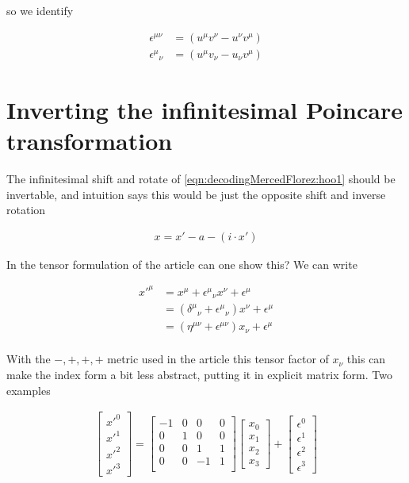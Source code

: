 so we identify

\begin{align*}
\epsilon^{\mu\nu} &= (u^\mu v^\nu - u^\nu v^\mu) \\
{\epsilon^{\mu}}_\nu &= (u^\mu v_\nu - u_\nu v^\mu)
\end{align*}

\section{Inverting the infinitesimal Poincare transformation}

The infinitesimal shift and rotate of \ref{eqn:decodingMercedFlorez:hoo1} should be invertable, and intuition says this would be just the opposite shift and inverse rotation

\begin{align}\label{eqn:decodingMercedFlorez:hoo2}
x = x' - a - (i \cdot x')
\end{align}

In the tensor formulation of the article can one show this?  We can write

\begin{align*}
{x'}^\mu 
&= x^\mu + {\epsilon^\mu}_\nu x^\nu + \epsilon^\mu \\
&= ({\delta^\mu}_\nu + {\epsilon^\mu}_\nu) x^\nu + \epsilon^\mu \\
&= (\eta^{\mu\nu} + \epsilon^{\mu\nu}) x_\nu + \epsilon^\mu \\
\end{align*}

With the $-,+,+,+$ metric used in the article this tensor factor of $x_\nu$ this can make the index form a bit less abstract, putting it in explicit matrix form.  Two examples

\begin{align*}
\begin{bmatrix}
{x'}^0 \\
{x'}^1 \\
{x'}^2 \\
{x'}^3
\end{bmatrix}
=
\begin{bmatrix}
-1 & 0 & 0 & 0 \\ 
0 & 1 & 0 & 0 \\ 
0 & 0 & 1 & 1 \\ 
0 & 0 & -1 & 1 \\ 
\end{bmatrix}
\begin{bmatrix}
x_0 \\
x_1 \\
x_2 \\
x_3
\end{bmatrix}
+
\begin{bmatrix}
\epsilon^0 \\
\epsilon^1 \\
\epsilon^2 \\
\epsilon^3
\end{bmatrix}
\end{align*}

